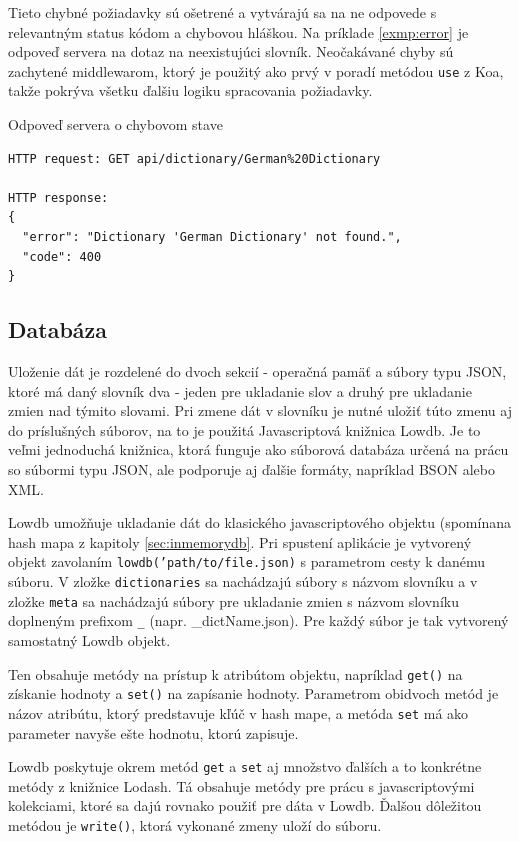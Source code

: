 \documentclass[
  digital, %
  table,   %
  lof,     %
  lot,     %
]{fithesis3}
\begin{document}
Tieto chybné požiadavky sú ošetrené a vytvárajú sa na ne odpovede s relevantným status kódom a chybovou hláškou. Na príklade \ref{exmp:error} je odpoveď servera na dotaz na neexistujúci slovník. Neočakávané chyby sú zachytené middlewarom, ktorý je použitý ako prvý v poradí metódou \texttt{use} z Koa, takže pokrýva všetku ďalšiu logiku spracovania požiadavky.

\begin{exmp}
\label{exmp:error}
Odpoveď servera o chybovom stave
\centering
\begin{lstlisting}[basicstyle=\small]
HTTP request: GET api/dictionary/German%20Dictionary

HTTP response:
{
  "error": "Dictionary 'German Dictionary' not found.",
  "code": 400
}
\end{lstlisting}
\end{exmp}

\subsection{Databáza}
Uloženie dát je rozdelené do dvoch sekcií - operačná pamäť a súbory typu JSON, ktoré má daný slovník dva - jeden pre ukladanie slov a druhý pre ukladanie zmien nad týmito slovami. Pri zmene dát v slovníku je nutné uložiť túto zmenu aj do príslušných súborov, na to je použitá Javascriptová knižnica Lowdb. Je to veľmi jednoduchá knižnica, ktorá funguje ako súborová databáza určená na prácu so súbormi typu JSON, ale podporuje aj ďalšie formáty, napríklad BSON alebo XML.

Lowdb umožňuje ukladanie dát do klasického javascriptového objektu (spomínana hash mapa z kapitoly \ref{sec:inmemorydb}. Pri spustení aplikácie je vytvorený objekt zavolaním \texttt{lowdb('path/to/file.json)} s parametrom cesty k danému súboru. V zložke \texttt{dictionaries} sa nachádzajú súbory s názvom slovníku a v zložke \texttt{meta} sa nachádzajú súbory pre ukladanie zmien s názvom slovníku doplneným prefixom \texttt{\_} (napr. \_dictName.json). Pre každý súbor je tak vytvorený samostatný Lowdb objekt.

Ten obsahuje metódy na prístup k atribútom objektu, napríklad \texttt{get()} na získanie hodnoty a \texttt{set()} na zapísanie hodnoty. Parametrom obidvoch metód je názov atribútu, ktorý predstavuje kľúč v hash mape, a metóda \texttt{set} má ako parameter navyše ešte hodnotu, ktorú zapisuje.

Lowdb poskytuje okrem metód \texttt{get} a \texttt{set} aj množstvo ďalších a to konkrétne metódy z knižnice Lodash. Tá obsahuje metódy pre prácu s javascriptovými kolekciami, ktoré sa dajú rovnako použiť pre dáta v Lowdb. Ďalšou dôležitou metódou je \texttt{write()}, ktorá vykonané zmeny uloží do súboru.
\end{document}
